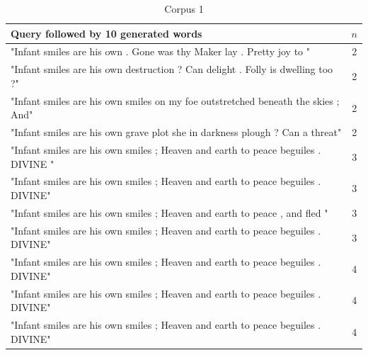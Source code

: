 \documentclass[a4paper,12pt]{article}
\begin{document}
\begin{table}
\small
\begin{tabular}{| l |c|}
\hline
Query followed by 10 generated words & $n$ \\ \hline
"Infant smiles are his own . Gone was thy Maker lay . Pretty joy to " & 2\\ \hline
"Infant smiles are his own destruction ? Can delight . Folly is dwelling too ?"& 2 \\ \hline
"Infant smiles are his own smiles on my foe outstretched beneath the skies ; And" & 2 \\ \hline
"Infant smiles are his own grave plot she in darkness plough ? Can a threat" & 2 \\ \hline

"Infant smiles are his own smiles ; Heaven and earth to peace beguiles . DIVINE " & 3 \\ \hline
"Infant smiles are his own smiles ; Heaven and earth to peace beguiles . DIVINE" & 3 \\ \hline
"Infant smiles are his own smiles ; Heaven and earth to peace , and fled " & 3 \\ \hline
"Infant smiles are his own smiles ; Heaven and earth to peace beguiles . DIVINE" & 3 \\ \hline

"Infant smiles are his own smiles ; Heaven and earth to peace beguiles . DIVINE" & 4 \\ \hline
"Infant smiles are his own smiles ; Heaven and earth to peace beguiles . DIVINE" & 4 \\ \hline
"Infant smiles are his own smiles ; Heaven and earth to peace beguiles . DIVINE" & 4 \\ \hline

\end{tabular}
\caption{ Corpus 1}
\label{tab:corpus1}
\end{table}
\end{document}
